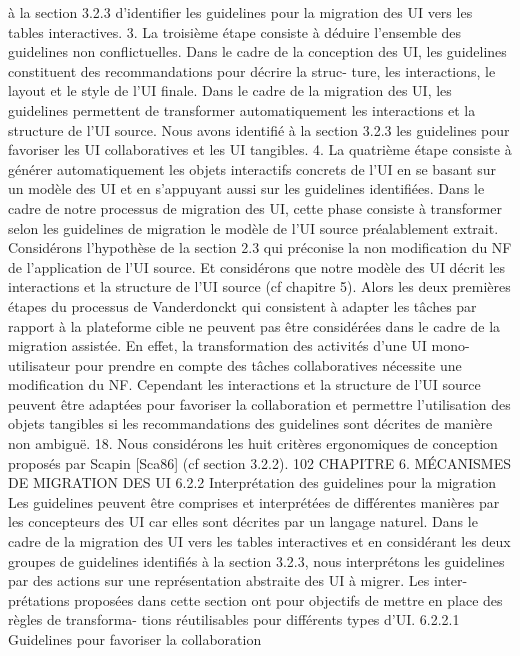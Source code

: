 \documentclass{article}
\begin{document}
à la section 3.2.3 d’identiﬁer les guidelines pour la migration des UI vers les tables interactives.
3. La troisième étape consiste à déduire l’ensemble des guidelines non conﬂictuelles. Dans le cadre
de la conception des UI, les guidelines constituent des recommandations pour décrire la struc-
ture, les interactions, le layout et le style de l’UI ﬁnale. Dans le cadre de la migration des UI, les
guidelines permettent de transformer automatiquement les interactions et la structure de l’UI
source. Nous avons identiﬁé à la section 3.2.3 les guidelines pour favoriser les UI collaboratives
et les UI tangibles.
4. La quatrième étape consiste à générer automatiquement les objets interactifs concrets de l’UI
en se basant sur un modèle des UI et en s’appuyant aussi sur les guidelines identiﬁées. Dans
le cadre de notre processus de migration des UI, cette phase consiste à transformer selon les
guidelines de migration le modèle de l’UI source préalablement extrait.
Considérons l’hypothèse de la section 2.3 qui préconise la non modiﬁcation du NF de l’application
de l’UI source. Et considérons que notre modèle des UI décrit les interactions et la structure de l’UI
source (cf chapitre 5). Alors les deux premières étapes du processus de Vanderdonckt qui consistent
à adapter les tâches par rapport à la plateforme cible ne peuvent pas être considérées dans le cadre de
la migration assistée. En effet, la transformation des activités d’une UI mono-utilisateur pour prendre
en compte des tâches collaboratives nécessite une modiﬁcation du NF.
Cependant les interactions et la structure de l’UI source peuvent être adaptées pour favoriser la
collaboration et permettre l’utilisation des objets tangibles si les recommandations des guidelines sont
décrites de manière non ambiguë.
18. Nous considérons les huit critères ergonomiques de conception proposés par Scapin [Sca86] (cf section 3.2.2).
102
CHAPITRE 6. MÉCANISMES DE MIGRATION DES UI
6.2.2
Interprétation des guidelines pour la migration
Les guidelines peuvent être comprises et interprétées de différentes manières par les concepteurs
des UI car elles sont décrites par un langage naturel. Dans le cadre de la migration des UI vers les
tables interactives et en considérant les deux groupes de guidelines identiﬁés à la section 3.2.3, nous
interprétons les guidelines par des actions sur une représentation abstraite des UI à migrer. Les inter-
prétations proposées dans cette section ont pour objectifs de mettre en place des règles de transforma-
tions réutilisables pour différents types d’UI.
6.2.2.1
Guidelines pour favoriser la collaboration
\end{document}
